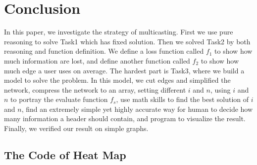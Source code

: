 \documentclass{mcmthesis}
\begin{document}
%
%
%


\section{Conclusion}

In this paper, we investigate the strategy of multicasting. First we use pure reasoning to solve Task1 which has fixed solution.
 Then we solved Task2 by both reasoning and function definition. We define a loss function called $f_{1}$ to show how much information are lost, and define another function called $f_{2}$ to show how much edge a user uses on average. The hardest part is Task3, where we build a model to solve the problem. In this model,
 we cut edges and simplified the network, compress the network to an array, setting different $i$ and $n$, using $i$ and $n$ to portray the evaluate function $f_{s}$, 
 use math skills to find the best solution of $i$ and $n$, find an extremely simple yet highly accurate way for human to decide how many information a header should contain, and program to
 visualize the result. Finally, we verified our result on simple graphs.

\newpage
\nocite{*}



\printbibliography

% 


\begin{appendices}
	\section{The Code of Heat Map}
	

\end{appendices}
\end{document}
